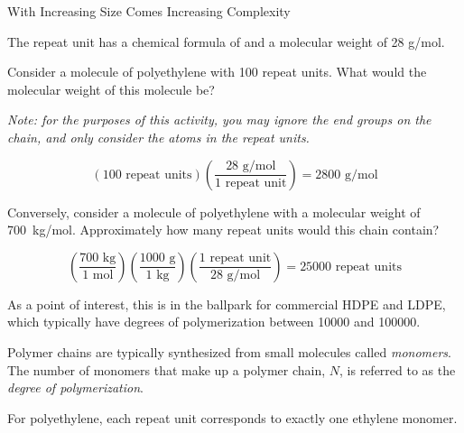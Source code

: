 \begin{activity}{With Increasing Size Comes Increasing Complexity}
\begin{model}
	The repeat unit has a chemical formula of  and a molecular weight of 28 g/mol.

\end{model}


\begin{ctqs}

	\question Consider a molecule of polyethylene with 100 repeat units.  What would the molecular weight of this molecule be?
			
				\emph{Note: for the purposes of this activity, you may ignore the  end groups on the chain, and only consider the atoms in the repeat units.}
	
		\begin{solution}[1.5in]
		
			\begin{equation*}
				\left(100\text{ repeat units}\right)\left(\frac{28\text{ g/mol}}{1\text{ repeat unit}}\right) = 2800\text{ g/mol}
			\end{equation*}
		\end{solution}
				
	\question Conversely, consider a molecule of polyethylene with a molecular weight of 700~kg/mol.  Approximately how many repeat units would this chain contain? \label{\labelbase:ctq:700kgPE}
	
		\begin{solution}[1.5in]
		\begin{equation*}
			\left(\frac{700\text{ kg}}{1\text{ mol}}\right)
			\left(\frac{1000\text{ g}}{1\text{ kg}}\right)
			\left(\frac{1\text{ repeat unit}}{28\text{ g/mol}}\right)
			= 25000\text{ repeat units}
		\end{equation*}
		
			As a point of interest, this is in the ballpark for commercial HDPE and LDPE, which typically have degrees of polymerization between 10000 and 100000.
		\end{solution}
	
\end{ctqs}

\begin{infobox}

	Polymer chains are typically synthesized from small molecules called \emph{monomers}.  The number of monomers that make up a polymer chain, $N$, is referred to as the \emph{degree of polymerization}.
	
	For polyethylene, each  repeat unit corresponds to exactly one ethylene monomer.


\end{infobox}
\end{activity}
